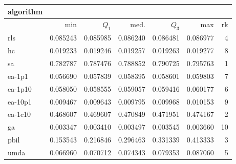 \begin{tabular}{@{}l*{5}{>{{}}N{1}{3}}>{{}}N{2}{0}@{}}
\toprule
{algorithm} &  \\
\midrule
& {min} & {$Q_1$} & {med.} & {$Q_3$} & {max} & {rk}\\
\midrule
rls & 0.085243 & 0.085985 & 0.086240 & 0.086481 & 0.086977 & 4\\
hc & 0.019233 & 0.019246 & 0.019257 & 0.019263 & 0.019277 & 8\\
sa & {\color{blue}} 0.782787 & {\color{blue}} 0.787476 & {\color{blue}} 0.788852 & {\color{blue}} 0.790725 & {\color{blue}} 0.795763 & 1\\
ea-1p1 & 0.056690 & 0.057839 & 0.058395 & 0.058601 & 0.059803 & 7\\
ea-1p10 & 0.058050 & 0.058555 & 0.059057 & 0.059416 & 0.060177 & 6\\
ea-10p1 & 0.009467 & 0.009643 & 0.009795 & 0.009968 & 0.010153 & 9\\
ea-1c10 & 0.468607 & 0.469607 & 0.470849 & 0.471951 & 0.474167 & 2\\
ga & 0.003347 & 0.003410 & 0.003497 & 0.003545 & 0.003660 & 10\\
pbil & 0.153543 & 0.216846 & 0.296463 & 0.331339 & 0.413333 & 3\\
umda & 0.066960 & 0.070712 & 0.074343 & 0.079353 & 0.087060 & 5\\
\bottomrule
\end{tabular}
